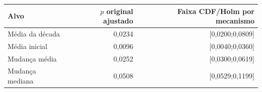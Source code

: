 \begin{tabular}{lrr}
\toprule
Alvo & $p$ original ajustado & Faixa CDF/Holm por mecanismo\\
\midrule
Média da década & 0,0234 & [0,0200;0,0809]\\
Média inicial & 0,0096 & [0,0040;0,0360]\\
Mudança média & 0,0252 & [0,0300;0,0619]\\
Mudança mediana & 0,0508 & [0,0529;0,1199]\\
\bottomrule
\end{tabular}
